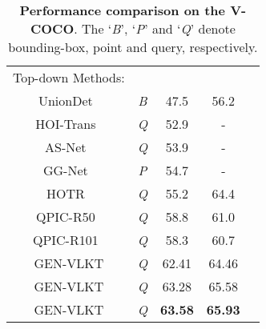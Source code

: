 \documentclass[10pt,twocolumn,letterpaper]{article}
\begin{document}
\begin{table}[t]
\begin{center}
\begin{tabular}{ccccc}
  \hline 
  Top-down Methods:     &                                    &  &\\
  UnionDet~\cite{Kim2020_unidet}		&\emph{B}			        &47.5  &56.2\\
  HOI-Trans~\cite{zou2021_hoitrans}		&\emph{Q}			        &52.9  &-\\
  AS-Net~\cite{chen_2021_asnet}		&\emph{Q}		        &53.9  &-\\
  GG-Net~\cite{zhong2021glance} &\emph{P}		        &54.7  &-\\
  HOTR~\cite{Kim_2021_CVPR} &\emph{Q}			        &55.2  & 64.4\\
  QPIC-R50~\cite{tamura2021qpic}		&\emph{Q}			        &58.8  &61.0 \\
  QPIC-R101~\cite{tamura2021qpic}		&\emph{Q}			        &58.3  &60.7 \\
  \cellcolor{mygray-bg}GEN-VLKT			 	&\cellcolor{mygray-bg}\emph{Q}			        &\cellcolor{mygray-bg}62.41 &\cellcolor{mygray-bg}64.46\\
    \cellcolor{mygray-bg}GEN-VLKT			 	&\cellcolor{mygray-bg}\emph{Q}			        &\cellcolor{mygray-bg}63.28  &\cellcolor{mygray-bg}65.58\\
    \cellcolor{mygray-bg}GEN-VLKT			 	&\cellcolor{mygray-bg}\emph{Q}			        &\cellcolor{mygray-bg}\textbf{63.58}  &\cellcolor{mygray-bg}\textbf{65.93}\\
  \hline
  \end{tabular}
  \end{center}
  \vspace{-3mm}
  \caption{\textbf{Performance comparison on the V-COCO}. The `\emph{B}', `\emph{P}' and `\emph{Q}' denote bounding-box, point and query, respectively.}
  \vspace{-3mm}
  \label{tb:vcoco}
\end{table}
\end{document}
